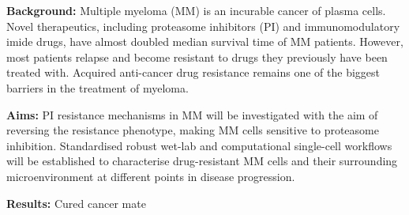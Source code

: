 \textbf{Background:} Multiple myeloma (MM) is an incurable cancer of plasma cells. Novel therapeutics, including proteasome inhibitors (PI) and immunomodulatory imide drugs, have almost doubled median survival time of MM patients. However, most patients relapse and become resistant to drugs they previously have been treated with. Acquired anti-cancer drug resistance remains one of the biggest barriers in the treatment of myeloma. 
    
\noindent
\textbf{Aims:} PI resistance mechanisms in MM will be investigated with the aim of reversing the resistance phenotype, making MM cells sensitive to proteasome inhibition. Standardised robust wet-lab and computational single-cell workflows will be established to characterise drug-resistant MM cells and their surrounding microenvironment at different points in disease progression. 
    
\noindent
\textbf{Results:} Cured cancer mate